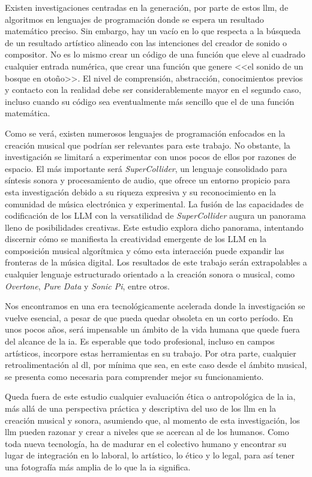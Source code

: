 Existen investigaciones centradas en la generación, por parte de estos \gls{llm}, de algoritmos en lenguajes de programación donde se espera un resultado matemático preciso. Sin embargo, hay un vacío en lo que respecta a la búsqueda de un resultado artístico alineado con las intenciones del creador de sonido o compositor. No es lo mismo crear un código de una función que eleve al cuadrado cualquier entrada numérica, que crear una función que genere <<el sonido de un bosque en otoño>>. El nivel de comprensión, abstracción, conocimientos previos y contacto con la realidad debe ser considerablemente mayor en el segundo caso, incluso cuando su código sea eventualmente más sencillo que el de una función matemática.

Como se verá, existen numerosos lenguajes de programación enfocados en la creación musical que podrían ser relevantes para este trabajo. No obstante, la investigación se limitará a experimentar con unos pocos de ellos por razones de espacio. El más importante será \textit{SuperCollider}, un lenguaje consolidado para síntesis sonora y procesamiento de audio, que ofrece un entorno propicio para esta investigación debido a su riqueza expresiva y su reconocimiento en la comunidad de música electrónica y experimental. La fusión de las capacidades de codificación de los LLM con la versatilidad de \textit{SuperCollider} augura un panorama lleno de posibilidades creativas. Este estudio explora dicho panorama, intentando discernir cómo se manifiesta la creatividad emergente de los LLM en la composición musical algorítmica y cómo esta interacción puede expandir las fronteras de la música digital. Los resultados de este trabajo serán extrapolables a cualquier lenguaje estructurado orientado a la creación sonora o musical, como \textit{Overtone}, \textit{Pure Data} y \textit{Sonic Pi}, entre otros. 

Nos encontramos en una era tecnológicamente acelerada donde la investigación se vuelve esencial, a pesar de que pueda quedar obsoleta en un corto período. En unos pocos años, será impensable un ámbito de la vida humana que quede fuera del alcance de la \gls{ia}. Es esperable que todo profesional, incluso en campos artísticos, incorpore estas herramientas en su trabajo. Por otra parte, cualquier retroalimentación al \gls{dl}, por mínima que sea, en este caso desde el ámbito musical, se presenta como necesaria para comprender mejor su funcionamiento.

Queda fuera de este estudio cualquier evaluación ética o antropológica de la \gls{ia}, más allá de una perspectiva práctica y descriptiva del uso de los \gls{llm} en la creación musical y sonora, asumiendo que, al momento de esta investigación, los \gls{llm} pueden razonar y crear a niveles que se acercan al de los humanos. Como toda nueva tecnología, ha de madurar en el colectivo humano y encontrar su lugar de integración en lo laboral, lo artístico, lo ético y lo legal, para así tener una fotografía más amplia de lo que la \gls{ia} significa.
